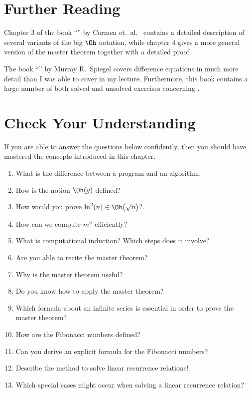 \section{Further Reading}
Chapter 3 of the book ``'' by Cormen et.~al.~\cite{cormen:09}
contains a detailed description of several variants of the big $\Oh$ notation, while
chapter 4 gives a more general version of the master theorem together with a detailed proof.

The book ``'' by Murray R.~Spiegel
\cite{spiegel:1971} covers difference equations in much more detail than I was able to cover in my lecture.
Furthermore, this book contains a large number of both solved and unsolved exercises concerning
. 

\section{Check Your Understanding}
If you are able to answer the questions below confidently, then you should have mastered the concepts
introduced in this chapter.
\begin{enumerate}
\item What is the difference between a program and an algorithm.
\item How is the notion $\Oh(g)$ defined?
\item How would you prove $\ln^2(n) \in \Oh\bigl(\sqrt{n}\bigr)$?.
\item How can we compute $m^n$ efficiently?
\item What is computational induction?  Which steps does it involve?
\item Are you able to recite the master theorem?
\item Why is the master theorem useful?
\item Do you know how to apply the master theorem?
\item Which formula about an infinite series is essential in order to prove the master theorem?
\item How are the Fibonacci numbers defined?
\item Can you derive an explicit formula for the Fibonacci numbers?
\item Describe the method to solve linear recurrence relations!
\item Which special cases might occur when solving a linear recurrence relation?
\end{enumerate}


